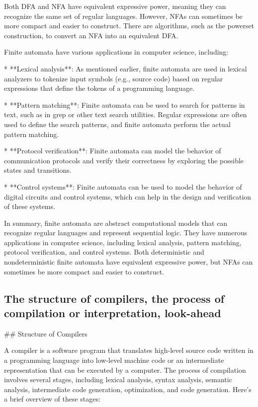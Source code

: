 \documentclass{article}
\begin{document}
Both DFA and NFA have equivalent expressive power, meaning they can recognize the same set of regular languages. However, NFAs can sometimes be more compact and easier to construct. There are algorithms, such as the powerset construction, to convert an NFA into an equivalent DFA.

Finite automata have various applications in computer science, including:

* **Lexical analysis**: As mentioned earlier, finite automata are used in lexical analyzers to tokenize input symbols (e.g., source code) based on regular expressions that define the tokens of a programming language.

* **Pattern matching**: Finite automata can be used to search for patterns in text, such as in grep or other text search utilities. Regular expressions are often used to define the search patterns, and finite automata perform the actual pattern matching.

* **Protocol verification**: Finite automata can model the behavior of communication protocols and verify their correctness by exploring the possible states and transitions.

* **Control systems**: Finite automata can be used to model the behavior of digital circuits and control systems, which can help in the design and verification of these systems.

In summary, finite automata are abstract computational models that can recognize regular languages and represent sequential logic. They have numerous applications in computer science, including lexical analysis, pattern matching, protocol verification, and control systems. Both deterministic and nondeterministic finite automata have equivalent expressive power, but NFAs can sometimes be more compact and easier to construct.


\subsection{The structure of compilers, the process of compilation or interpretation, look-ahead}

## Structure of Compilers

A compiler is a software program that translates high-level source code written in a programming language into low-level machine code or an intermediate representation that can be executed by a computer. The process of compilation involves several stages, including lexical analysis, syntax analysis, semantic analysis, intermediate code generation, optimization, and code generation. Here's a brief overview of these stages:
\end{document}

